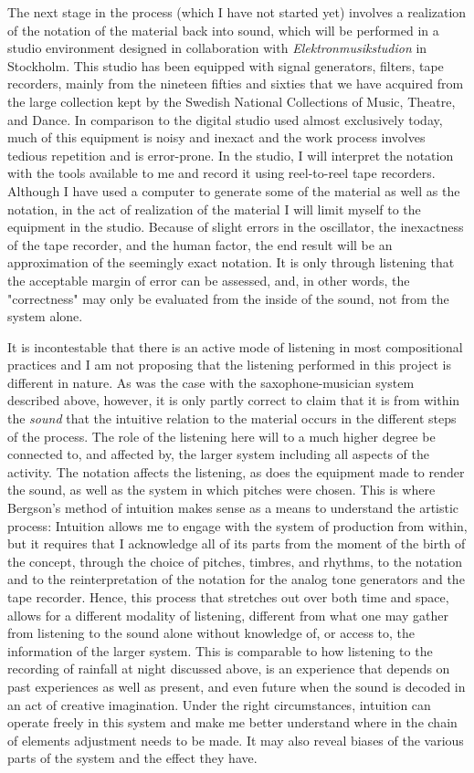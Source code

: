 \documentclass[11pt]{article}
\begin{document}
The next stage in the process (which I have not started yet) involves a realization of the notation of the material back into sound, which will be performed in a studio environment designed in collaboration with \emph{Elektronmusikstudion} in Stockholm.
This studio has been equipped with signal generators, filters, tape recorders, mainly from the nineteen fifties and sixties that we have acquired from the large collection kept by the Swedish National Collections of Music, Theatre, and Dance.
In comparison to the digital studio used almost exclusively today, much of this equipment is noisy and inexact and the work process involves tedious repetition and is error-prone.
In the studio, I will interpret the notation with the tools available to me and record it using reel-to-reel tape recorders.
Although I have used a computer to generate some of the material as well as the notation, in the act of realization of the material I will limit myself to the equipment in the studio. 
Because of slight errors in the oscillator, the inexactness of the tape recorder, and the human factor, the end result will be an approximation of the seemingly exact notation.
It is only through listening that the acceptable margin of error can be assessed, and, in other words, the "correctness" may only be evaluated from the inside of the sound, not from the system alone.


It is incontestable that there is an active mode of listening in most compositional practices and I am not proposing that the listening performed in this project is different in nature.
As was the case with the saxophone-musician system described above, however, it is only partly correct to claim that it is from within the \emph{sound} that the intuitive relation to the material occurs in the different steps of the process.
The role of the listening here will to a much higher degree be connected to, and affected by, the larger system including all aspects of the activity.
The notation affects the listening, as does the equipment made to render the sound, as well as the system in which pitches were chosen.
This is where Bergson's method of intuition makes sense as a means to understand the artistic process:
Intuition allows me to engage with the system of production from within, but it requires that I acknowledge all of its parts from the moment of the birth of the concept, through the choice of pitches, timbres, and rhythms, to the notation and to the reinterpretation of the notation for the analog tone generators and the tape recorder.
Hence, this process that stretches out over both time and space, allows for a different modality of listening, different from what one may gather from listening to the sound alone without knowledge of, or access to, the information of the larger system.
This is comparable to how listening to the recording of rainfall at night discussed above, is an experience that depends on past experiences as well as present, and even future when the sound is decoded in an act of creative imagination.
Under the right circumstances, intuition can operate freely in this system and make me better understand where in the chain of elements adjustment needs to be made.
It may also reveal biases of the various parts of the system and the effect they have. 
\end{document}
